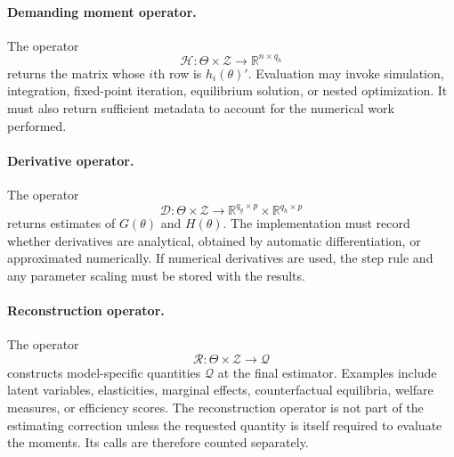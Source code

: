 \paragraph{Demanding moment operator.}
The operator
\begin{equation}
 \mathcal H:
 \Theta\times\mathcal Z
 \longrightarrow
 \mathbb R^{n\times q_h}
 \label{eq:app_H_operator}
\end{equation}
returns the matrix whose $i$th row is $h_i(\theta)'$. Evaluation may invoke
simulation, integration, fixed-point iteration, equilibrium solution, or nested
optimization. It must also return sufficient metadata to account for the
numerical work performed.

\paragraph{Derivative operator.}
The operator
\begin{equation}
 \mathcal D:
 \Theta\times\mathcal Z
 \longrightarrow
 \mathbb R^{q_g\times p}
 \times
 \mathbb R^{q_h\times p}
 \label{eq:app_D_operator}
\end{equation}
returns estimates of $G(\theta)$ and $H(\theta)$. The implementation must
record whether derivatives are analytical, obtained by automatic
differentiation, or approximated numerically. If numerical derivatives are
used, the step rule and any parameter scaling must be stored with the results.

\paragraph{Reconstruction operator.}
The operator
\begin{equation}
 \mathcal R:
 \Theta\times\mathcal Z
 \longrightarrow
 \mathcal Q
 \label{eq:app_R_operator}
\end{equation}
constructs model-specific quantities $\mathcal Q$ at the final estimator.
Examples include latent variables, elasticities, marginal effects,
counterfactual equilibria, welfare measures, or efficiency scores. The
reconstruction operator is not part of the estimating correction unless the
requested quantity is itself required to evaluate the moments. Its calls are
therefore counted separately.


